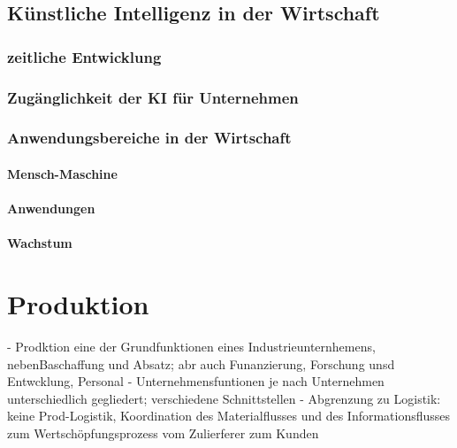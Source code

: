\documentclass[a4paper,12pt, german]{report}
\begin{document}


\subsection{Künstliche Intelligenz in der Wirtschaft}

\subsubsection{zeitliche Entwicklung}

\subsubsection{Zugänglichkeit der KI für Unternehmen}

\subsubsection{Anwendungsbereiche in der Wirtschaft}

\paragraph{Mensch-Maschine}


\paragraph{Anwendungen}


\paragraph{Wachstum}





\section{Produktion}

- Prodktion eine der Grundfunktionen eines Industrieunternhemens, nebenBaschaffung und Absatz; abr auch Funanzierung, Forschung unsd Entwcklung, Personal 
- Unternehmensfuntionen je nach Unternehmen unterschiedlich gegliedert; verschiedene Schnittstellen
- Abgrenzung zu Logistik: keine Prod-Logistik, Koordination des Materialflusses und des Informationsflusses zum Wertschöpfungsprozess vom Zulierferer zum Kunden
\cite{07}
\end{document}
